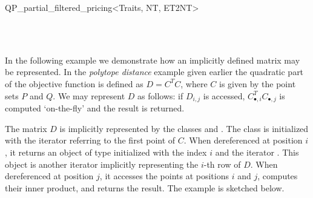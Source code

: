 \begin{ccRefClass}{QP_partial_filtered_pricing<Traits, NT, ET2NT>}
\begin{ccIndexMemberFunctions}

\end{ccIndexMemberFunctions}


\ccSeeAlso
%
    \\
    \\

\ccImplementation
\ccIndexImplementation


\ccExample
In the following example we demonstrate how an implicitly defined matrix may be
represented.
In the \emph{polytope distance} example given earlier the quadratic part of the
objective function is defined as $D=C^{T}C$, where $C$ is given by the point
sets $P$ and $Q$. We may represent $D$ as follows: if $D_{i,j}$ is accessed,
$C_{\bullet, i}^{T}C_{\bullet, j}$ is computed `on-the-fly' and the result is
returned. 

The matrix $D$ is implicitly represented by the classes
 and .
The class  is initialized with the iterator
 referring to the first point of $C$. When dereferenced at
position $i$, it returns an object of type 
initialized with the index $i$ and the iterator . This object is
another iterator implicitly representing the $i$-th row of $D$. When
dereferenced at position $j$, it accesses the points at positions $i$ and $j$,
computes their inner product, and returns the result. The example is sketched
below.


\end{ccRefClass}


